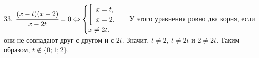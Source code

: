 33. $\cfrac{(x-t)(x-2)}{x-2t}=0\Leftrightarrow\begin{cases}\left[\begin{array}{l}x=t,\\ x=2.\end{array}\right.\\x\neq2t.\end{cases}$ У этого уравнения ровно два корня, если они не совпадают друг с другом и с $2t.$ Значит, $t\neq2,\ t\neq2t$ и $2\neq2t.$ Таким образом, $t\notin\{0; 1; 2\}.$\\
